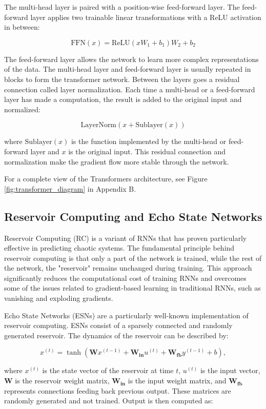 \documentclass[11pt]{article}
\begin{document}
The multi-head layer is paired with a position-wise feed-forward layer. The feed-forward layer applies two trainable linear transformations with a ReLU activation in between:

$$\text{FFN}(x) = \text{ReLU}(xW_1 + b_1)W_2 + b_2$$

The feed-forward layer allows the network to learn more complex representations of the data. The multi-head layer and feed-forward layer is usually repeated in blocks to form the transformer network. Between the layers goes a residual connection called layer normalization. Each time a multi-head or a feed-forward layer has made a computation, the result is added to the original input and normalized:

$$\text{LayerNorm}(x + \text{Sublayer}(x))$$

where $\text{Sublayer}(x)$ is the function implemented by the multi-head or feed-forward layer and $x$ is the original input. This residual connection and normalization make the gradient flow more stable through the network. 

For a complete view of the Transformers architecture, see Figure \ref{fig:transformer_diagram} in Appendix B.

\subsection{Reservoir Computing and Echo State Networks}

Reservoir Computing (RC) is a variant of RNNs that has proven particularly effective in predicting chaotic systems. The fundamental principle behind reservoir computing is that only a part of the network is trained, while the rest of the network, the "reservoir" remains unchanged during training. This approach significantly reduces the computational cost of training RNNs and overcomes some of the issues related to gradient-based learning in traditional RNNs, such as vanishing and exploding gradients.

Echo State Networks (ESNs) are a particularly well-known implementation of reservoir computing. ESNs consist of a sparsely connected and randomly generated reservoir. The dynamics of the reservoir can be described by:

\begin{equation}
x^{(t)} = \tanh(\mathbf{W}x^{(t-1)} + \mathbf{W_{in}}u^{(t)} + \mathbf{W_{fb}}y^{(t-1)} + b),
\end{equation}

where $x^{(t)}$ is the state vector of the reservoir at time $t$, $u^{(t)}$ is the input vector, $\mathbf{W}$ is the reservoir weight matrix, $\mathbf{W_{in}}$ is the input weight matrix, and $\mathbf{W_{fb}}$ represents connections feeding back previous output. These matrices are randomly generated and not trained. Output is then computed as:
\end{document}
